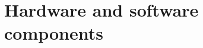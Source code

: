\chapter{Hardware and software components}

\iffalse
Description of necessary hardware and software components. The project should at least feature 2 ROS nodes that are in communication with each other. And it should implement at least two functions. Usage of actual robot hardware is optional in this mini project.
\fi